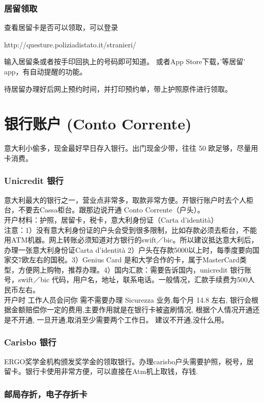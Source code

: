 \documentclass[3pt,a5paper,openright,twoside]{book}
\begin{document}
\subsubsection{居留领取}
查看居留卡是否可以领取，可以登录

http://questure.poliziadistato.it/stranieri/

输入居留条或者按手印回执上的号码即可知道。
或者App Store下载，’等居留’ app，有自动提醒的功能。

待居留办理好后网上预约时间，并打印预约单，带上护照原件进行领取。

\section{银行账户 (Conto Corrente)}

意大利小偷多，现金最好早日存入银行。出门现金少带，往往 50 欧足够，尽量用卡消费。

\subsubsection{Unicredit 银行}

意大利最大的银行之一，营业点非常多，取款非常方便。开银行账户时去个人柜台，不要去Cassa柜台。跟那边说开通 Conto Corrente（户头）。\\
开户材料：护照，居留卡，税卡，意大利身份证（Carta d’identità）\\
注意：1）没有意大利身份证的户头会受到很多限制，比如存款必须去柜台，不能用ATM机器。网上转账必须知道对方银行的swift／bic。所以建议抵达意大利后，办理一张意大利身份证Carta d’identità 2）户头在存款5000以上时，每季度要向国家交7欧左右的国税。3）Genius Card 是和大学合作的卡，属于MasterCard类型，方便网上购物，推荐办理。4）国内汇款：需要告诉国内，unicredit 银行账号，swift／bic 代码，用户名，地址，联系电话。一般情况，汇款手续费为500人民币左右。\\
开户时 工作人员会问你 需不需要办理 Sicurezza 业务,每个月 14.8 左右, 银行会根据金额赔偿你一定的费用,主要作用就是在银行卡被盗刷情况, 根据个人情况开通还是不开通, 一旦开通,取消至少需要两个工作日。 建议不开通,没什么用。

\subsubsection{Carisbo 银行}
ERGO奖学金机构颁发奖学金的领取银行。办理carisbo户头需要护照，税号，居留卡。银行卡使用非常方便，可以直接在Atm机上取钱，存钱.

\subsubsection{邮局存折，电子存折卡}
\end{document}
